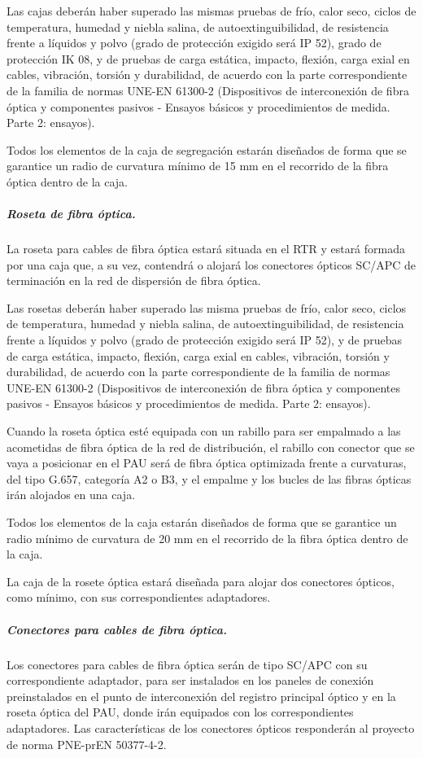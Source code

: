 Las cajas deberán haber superado las mismas pruebas de frío, calor seco, ciclos de temperatura, humedad y niebla salina, de autoextinguibilidad, de resistencia frente a líquidos y polvo (grado de protección exigido será IP 52), grado de protección IK 08, y de pruebas de carga estática, impacto, flexión, carga exial en cables, vibración, torsión y durabilidad, de acuerdo con la parte correspondiente de la familia de normas UNE-EN 61300-2 (Dispositivos de interconexión de fibra óptica y componentes pasivos - Ensayos básicos y procedimientos de medida. Parte 2: ensayos).

Todos los elementos de la caja de segregación estarán diseñados de forma que se garantice un radio de curvatura mínimo de 15 mm en el recorrido de la fibra óptica dentro de la caja.

\subparagraph{Roseta de fibra óptica.}
La roseta para cables de fibra óptica estará situada en el RTR y estará formada por una caja que, a su vez, contendrá o alojará los conectores ópticos SC/APC de terminación en la red de dispersión de fibra óptica.

Las rosetas deberán haber superado las misma pruebas de frío, calor seco, ciclos de temperatura, humedad y niebla salina, de autoextinguibilidad, de resistencia frente a líquidos y polvo (grado de protección exigido será IP 52), y de pruebas de carga estática, impacto, flexión, carga exial en cables, vibración, torsión y durabilidad, de acuerdo con la parte correspondiente de la familia de normas UNE-EN 61300-2 (Dispositivos de interconexión de fibra óptica y componentes pasivos - Ensayos básicos y procedimientos de medida. Parte 2: ensayos).

Cuando la roseta óptica esté equipada con un rabillo para ser empalmado a las acometidas de fibra óptica de la red de distribución, el rabillo con conector que se vaya a posicionar en el PAU será de fibra óptica optimizada frente a curvaturas, del tipo G.657, categoría A2 o B3, y el empalme y los bucles de las fibras ópticas irán alojados en una caja.

Todos los elementos de la caja estarán diseñados de forma que se garantice un radio mínimo de curvatura de 20 mm en el recorrido de la fibra óptica dentro de la caja.

La caja de la rosete óptica estará diseñada para alojar dos conectores ópticos, como mínimo, con sus correspondientes adaptadores.

\subparagraph{Conectores para cables de fibra óptica.}
Los conectores para cables de fibra óptica serán de tipo SC/APC con su correspondiente adaptador, para ser instalados en los paneles de conexión preinstalados en el punto de interconexión del registro principal óptico y en la roseta óptica del PAU, donde irán equipados con los correspondientes adaptadores. Las características de los conectores ópticos responderán al proyecto de norma PNE-prEN 50377-4-2.

